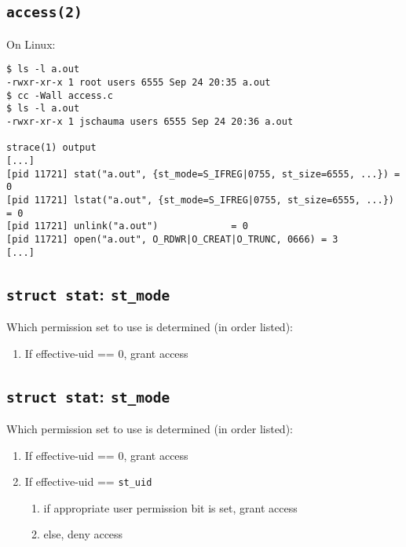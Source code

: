 \documentclass[xga]{xdvislides}
\begin{document}
\subsection{{\tt access(2)}}
On Linux:
\begin{verbatim}
$ ls -l a.out
-rwxr-xr-x 1 root users 6555 Sep 24 20:35 a.out
$ cc -Wall access.c
$ ls -l a.out
-rwxr-xr-x 1 jschauma users 6555 Sep 24 20:36 a.out

strace(1) output
[...]
[pid 11721] stat("a.out", {st_mode=S_IFREG|0755, st_size=6555, ...}) = 0
[pid 11721] lstat("a.out", {st_mode=S_IFREG|0755, st_size=6555, ...}) = 0
[pid 11721] unlink("a.out")             = 0
[pid 11721] open("a.out", O_RDWR|O_CREAT|O_TRUNC, 0666) = 3
[...]
\end{verbatim}


\subsection{{\tt struct stat}: {\tt st\_mode}}
Which permission set to use is determined (in order listed):
\begin{enumerate}
	\item If effective-uid == 0, grant access
\end{enumerate}

\subsection{{\tt struct stat}: {\tt st\_mode}}
Which permission set to use is determined (in order listed):
\begin{enumerate}
	\item If effective-uid == 0, grant access
	\item If effective-uid == {\tt st\_uid}
		\begin{enumerate}
			\item if appropriate user permission bit is set, grant access
			\item else, deny access
		\end{enumerate}
\end{enumerate}
\end{document}
